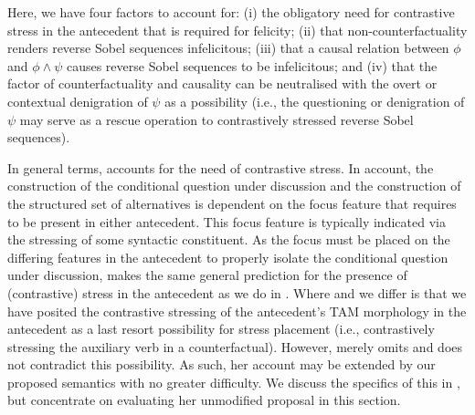 Here, we have four factors to account for: (i) the obligatory need for contrastive stress in the antecedent that is required for felicity; (ii) that non-counterfactuality renders reverse Sobel sequences infelicitous; (iii) that a causal relation between $\phi$ and $\phi\land\psi$ causes reverse Sobel sequences to be infelicitous; and (iv) that the factor of counterfactuality and causality can be neutralised with the overt or contextual denigration of $\psi$ as a possibility (i.e., the questioning or denigration of $\psi$ may serve as a rescue operation to contrastively stressed reverse Sobel sequences).

In general terms, \textcite{Ippolito2020} accounts for the need of contrastive stress. In  account, the construction of the conditional question under discussion and the construction of the structured set of alternatives is dependent on the focus feature that \textcite{Ippolito2020} requires to be present in either antecedent. This focus feature is typically indicated via the stressing of some syntactic constituent. As the focus must be placed on the differing features in the antecedent to properly isolate the conditional question under discussion, \textcite{Ippolito2020} makes the same general prediction for the presence of (contrastive) stress in the antecedent as we do in . Where \textcite{Ippolito2020} and we differ is that we have posited the contrastive stressing of the antecedent's TAM morphology in the antecedent as a last resort possibility for stress placement (i.e., contrastively stressing the auxiliary verb in a counterfactual). However, \textcite{Ippolito2020} merely omits and does not contradict this possibility. As such, her account may be extended by our proposed semantics with no greater difficulty. We discuss the specifics of this in , but concentrate on evaluating her unmodified proposal in this section.

